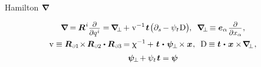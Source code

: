  Hamilton~${\hspace{-0.3ex}\bm{\nabla}\hspace{-0.2ex}}$

\nopagebreak\begin{gather*}
\boldnabla \hspace{-0.1ex}
= \hspace{-0.1ex} \RepresentedLocationVector^{i} \scalebox{.88}{$ \displaystyle\frac{\raisebox{-0.2em}{$ \partial $}}{\partial q^{\hspace{.1ex}i}} $}
= \hspace{-0.2ex} \perpendicularboldnabla \hspace{-0.2ex} + \hspace{.1ex} \RepresentedVolume^{-1} \hspace{.2ex} \bm{t} \hspace{.2ex} \bigl( \partial_s \hspace{-0.2ex} - \psi_{t} \hspace{.1ex} \mathrm{D} \bigr) \hspace{-0.1ex}
, \hspace{.5em}
\perpendicularboldnabla \hspace{-0.3ex} \equiv \bm{e}_{\alpha} \hspace{.2ex} \scalebox{.88}{$ \displaystyle\frac{\raisebox{-0.2em}{$ \partial $}}{\partial x_{\alpha}} $}
\hspace{.1ex} ,
\\
%
\RepresentedVolume \equiv \RepresentedLocationVector_{\hspace{.15ex}\differentialindex{1}} \hspace{-0.4ex} \times \hspace{-0.2ex} \RepresentedLocationVector_{\hspace{.15ex}\differentialindex{2}} \dotp \RepresentedLocationVector_{\hspace{.15ex}\differentialindex{3}} \hspace{-0.2ex}
= \smallparameter^{-1} \hspace{-0.1ex} + \hspace{.2ex} \bm{t} \hspace{.2ex} \dotp \hspace{.2ex} \perpendicularrodfeatures \hspace{-0.3ex} \times \bm{x}
\hspace{.1ex} ,
\hspace{.5em}
\mathrm{D} \hspace{-0.1ex} \equiv \bm{t} \hspace{.2ex} \dotp \hspace{.2ex} \bm{x} \times \hspace{-0.3ex} \perpendicularboldnabla
\hspace{.1ex} ,
\\[.2em]
%
\perpendicularrodfeatures \hspace{-0.3ex} + \psi_{t} \hspace{.2ex} \bm{t} = \rodfeaturesvector
\end{gather*}

